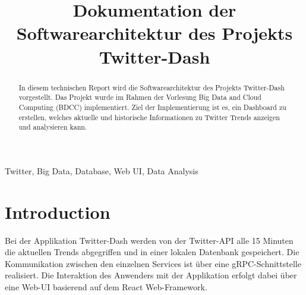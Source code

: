 \documentclass[conference]{IEEEtran}
\begin{document}
\title{Dokumentation der Softwarearchitektur des Projekts Twitter-Dash}

\author{
    \and

    \and

    \and

    \and

    \and

}

\maketitle

\begin{abstract}
    In diesem technischen Report wird die Softwarearchitektur des Projekts
    Twitter-Dash vorgestellt. Das Projekt wurde im Rahmen der Vorlesung
    Big Data and Cloud Computing (BDCC) implementiert. Ziel der Implementierung ist es,
    ein Dashboard zu erstellen, welches aktuelle und historische Informationen zu Twitter Trends
    anzeigen und analysieren kann.
\end{abstract}

\begin{IEEEkeywords}
    Twitter, Big Data, Database, Web UI, Data Analysis
\end{IEEEkeywords}

\section{Introduction}
Bei der Applikation Twitter-Dash werden von der Twitter-API alle 15 Minuten die aktuellen Trends
abgegriffen und in einer lokalen Datenbank gespeichert. Die Kommunikation zwischen den
einzelnen Services ist über eine gRPC-Schnittstelle realisiert.
Die Interaktion des Anwenders mit der Applikation erfolgt dabei über eine Web-UI basierend auf dem
React Web-Framework.
\end{document}
